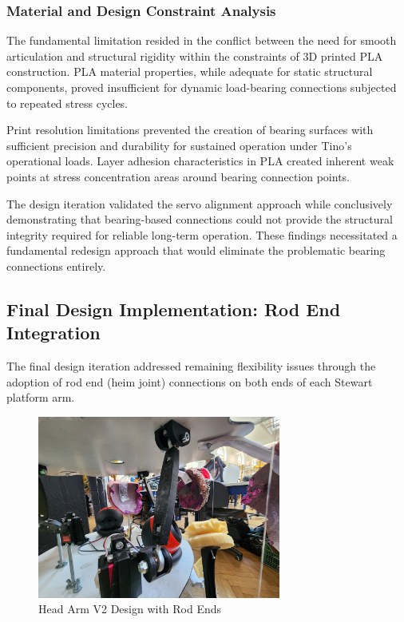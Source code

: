\subsubsection{Material and Design Constraint Analysis}

The fundamental limitation resided in the conflict between the need for smooth articulation and structural rigidity within the constraints of 3D printed PLA construction. PLA material properties, while adequate for static structural components, proved insufficient for dynamic load-bearing connections subjected to repeated stress cycles.

Print resolution limitations prevented the creation of bearing surfaces with sufficient precision and durability for sustained operation under Tino's operational loads. Layer adhesion characteristics in PLA created inherent weak points at stress concentration areas around bearing connection points.

The design iteration validated the servo alignment approach while conclusively demonstrating that bearing-based connections could not provide the structural integrity required for reliable long-term operation. These findings necessitated a fundamental redesign approach that would eliminate the problematic bearing connections entirely.

\subsection{Final Design Implementation: Rod End Integration}

The final design iteration addressed remaining flexibility issues through the adoption of rod end (heim joint) connections on both ends of each Stewart platform arm.

\begin{figure}[H]
    \centering
    \includegraphics[height=6cm]{Images/NewHeadDoubleJoint (4).jpg}
    \caption{Head Arm V2 Design with Rod Ends}
    \label{fig:head_arm_v2}
\end{figure}

